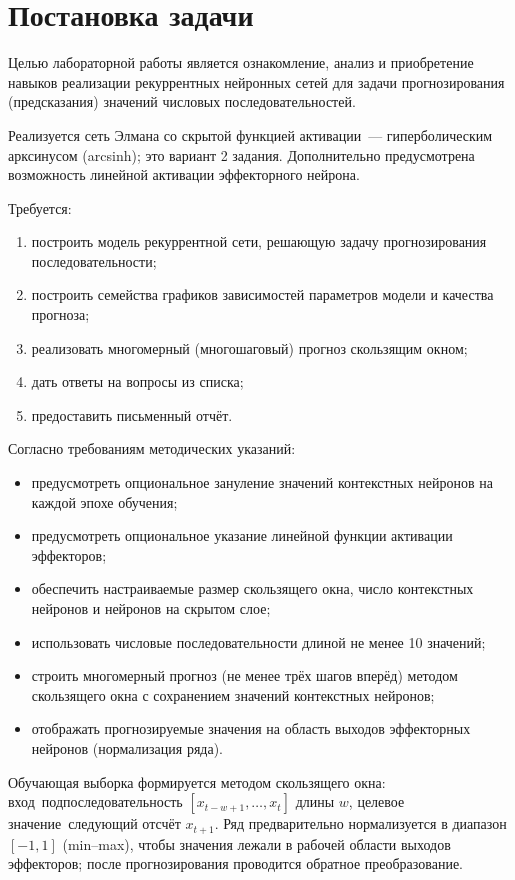 \section{Постановка задачи}
\label{sec:task}

Целью лабораторной работы является ознакомление, анализ и приобретение навыков реализации рекуррентных нейронных сетей для задачи прогнозирования (предсказания) значений числовых последовательностей.

Реализуется сеть Элмана со скрытой функцией активации~--- гиперболическим арксинусом (arcsinh); это вариант 2 задания. Дополнительно предусмотрена возможность линейной активации эффекторного нейрона.

Требуется:
\begin{enumerate}
	\item построить модель рекуррентной сети, решающую задачу прогнозирования последовательности;
	\item построить семейства графиков зависимостей параметров модели и качества прогноза;
	\item реализовать многомерный (многошаговый) прогноз скользящим окном;
	\item дать ответы на вопросы из списка;
	\item предоставить письменный отчёт.
\end{enumerate}

Согласно требованиям методических указаний:
\begin{itemize}
	\item предусмотреть опциональное зануление значений контекстных нейронов на каждой эпохе обучения;
	\item предусмотреть опциональное указание линейной функции активации эффекторов;
	\item обеспечить настраиваемые размер скользящего окна, число контекстных нейронов и нейронов на скрытом слое;
	\item использовать числовые последовательности длиной не менее 10 значений;
	\item строить многомерный прогноз (не менее трёх шагов вперёд) методом скользящего окна с сохранением значений контекстных нейронов;
	\item отображать прогнозируемые значения на область выходов эффекторных нейронов (нормализация ряда).
\end{itemize}

Обучающая выборка формируется методом скользящего окна: вход~\mdash  подпоследовательность $[x_{t-w+1}, \dots, x_t]$ длины $w$, целевое значение~\mdash  следующий отсчёт $x_{t+1}$. Ряд предварительно нормализуется в диапазон $[-1, 1]$ (min--max), чтобы значения лежали в рабочей области выходов эффекторов; после прогнозирования проводится обратное преобразование.
